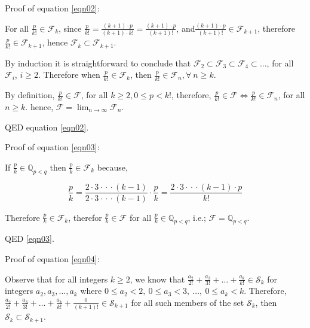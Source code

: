 \documentclass{article}
\begin{document}
\break
Proof of equation \eqref{eqn02}:

For all \(\frac{p}{k!} \in \mathcal{F}_k\),
since \(\frac{p}{k!} = \frac{(k+1)\cdot{}p}{(k+1)\cdot{}k!} = \frac{(k+1)\cdot{}p}{(k+1)!}\),
and\newline \(\frac{(k+1)\cdot{}p}{(k+1)!} \in \mathcal{F}_{k+1}\),
therefore \(\frac{p}{k!} \in \mathcal{F}_{k+1}\),
hence \(\mathcal{F}_k \subset \mathcal{F}_{k+1}\).

By induction it is straightforward to conclude that
\(\mathcal{F}_2
\subset \mathcal{F}_3
\subset \mathcal{F}_4
\subset \dots{}
\), for all \(\mathcal{F}_i\), \(i \ge{} 2\). Therefore when
\(\frac{p}{k!} \in \mathcal{F}_k\), then \(\frac{p}{k!} \in \mathcal{F}_n, \forall\ n \ge{} k\).

By definition, \(\frac{p}{k!} \in \mathcal{F}\), for all \(k \ge{} 2, 0 \le{} p < k!\),
therefore, \(\frac{p}{k!} \in \mathcal{F} \Leftrightarrow \frac{p}{k!}
\in \mathcal{F}_n\), for all \(n \ge k\).
hence, \(\displaystyle{\mathcal{F} = \lim_{n \to \infty}\mathcal{F}_n}\).

QED equation \eqref{eqn02}.

\bigskip
Proof of equation \eqref{eqn03}:

If \(\frac{p}{k} \in \mathbb{Q}_{p<q}\)
then \(\frac{p}{k} \in{} \mathcal{F}_k\) because,

{\small
\bgroup                                  %
\setlength{\abovedisplayskip}{0pt}       %
\begin{equation*}
\frac{p}{k}
= \frac{2\cdot{}3\cdot{}\cdot{}\cdot{}(k-1)}{2\cdot{}3\cdot{}\cdot{}\cdot{}(k-1)} \cdot{} \frac{p}{k}
= \frac{2\cdot{}3\cdot{}\cdot{}\cdot{}(k-1)\cdot{}p}{k!}
\end{equation*}
\egroup
}

Therefore \(\frac{p}{k} \in \mathcal{F}_k\), therefor \(\frac{p}{k} \in \mathcal{F}\)
for all \(\frac{p}{k} \in \mathbb{Q}_{p<q}\), i.e.; \(\mathcal{F} = \mathbb{Q}_{p<q}\).

QED \eqref{eqn03}.

\bigskip
Proof of equation \eqref{eqn04}:

Observe that for all integers \(k \ge{} 2\), we know that
\(\frac{a_2}{2!} + \frac{a_3}{3!} + \dots{} + \frac{a_k}{k!} \in \mathcal{S}_k\) for
integers \(a_2, a_3, \dots{}, a_k\) where
\(0\!\le{}\!a_2\!<\!2,\ 
0\!\le{}\!a_3\!<\!3,\ 
\dots{},\ 
0\!\le{}\!a_k\!<\!k\).
Therefore, \(\frac{a_2}{2!} + \frac{a_3}{3!} + \dots{} + \frac{a_k}{k!} + \frac{0}{(k+1)!}  \in \mathcal{S}_{k+1}\) for
all such members of the set \(\mathcal{S}_k\), then 
\(\mathcal{S}_k \subset \mathcal{S}_{k+1}\).
\end{document}
